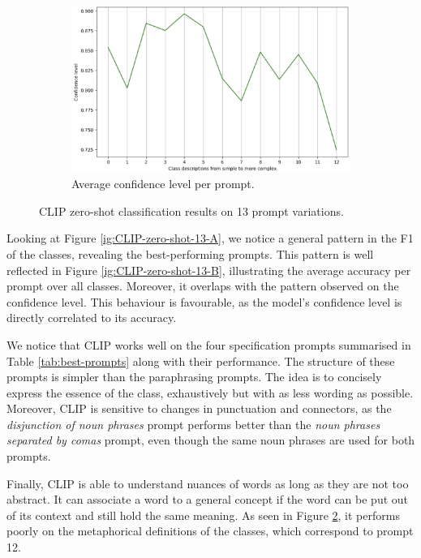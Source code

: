 \begin{figure}[ht]
    \hspace{0.06\textwidth}%
    
    \begin{subfigure}{0.47\textwidth}
        \includegraphics[width=\linewidth]{Images/CLIP-results/Confidence.png}
        \caption{Average confidence level per prompt.}
        \label{ig:Confidence-levels}
    \end{subfigure}
    
    \caption{CLIP zero-shot classification results on 13 prompt variations.}
    \label{fig:CLIP-zero-shot-13}
\end{figure}

Looking at Figure \ref{ig:CLIP-zero-shot-13-A}, we notice a general pattern in the F1 of the classes, revealing the best-performing prompts. This pattern is well reflected in Figure \ref{ig:CLIP-zero-shot-13-B}, illustrating the average accuracy per prompt over all classes. Moreover, it overlaps with the pattern observed on the confidence level. This behaviour is favourable, as the model's confidence level is directly correlated to its accuracy.

We notice that CLIP works well on the four specification prompts summarised in Table \ref{tab:best-prompts} along with their performance. The structure of these prompts is simpler than the paraphrasing prompts. The idea is to concisely express the essence of the class, exhaustively but with as less wording as possible.
Moreover, CLIP is sensitive to changes in punctuation and connectors, as the \textit{disjunction of noun phrases} prompt performs better than the \textit{noun phrases separated by comas} prompt, even though the same noun phrases are used for both prompts.


Finally, CLIP is able to understand nuances of words as long as they are not too abstract. It can associate a word to a general concept if the word can be put out of its context and still hold the same meaning. As seen in Figure \ref{fig:CLIP-zero-shot-13}, it performs poorly on the metaphorical definitions of the classes, which correspond to prompt 12.


